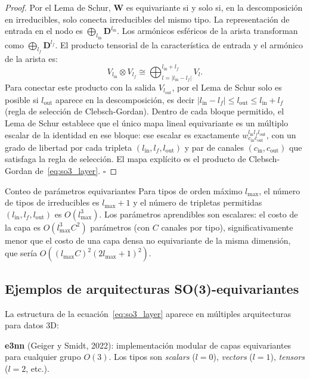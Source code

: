 \begin{proof}
Por el Lema de Schur, $\bm{W}$ es equivariante si y solo si, en la
descomposición en irreducibles, solo conecta irreducibles del mismo tipo.
La representación de entrada en el nodo es $\bigoplus_{l_{\mathrm{in}}}
\bm{D}^{l_{\mathrm{in}}}$. Los armónicos esféricos de la arista transforman
como $\bigoplus_{l_f} \bm{D}^{l_f}$. El producto tensorial de la
característica de entrada y el armónico de la arista es:
\[
  V_{l_{\mathrm{in}}} \otimes V_{l_f}
  \cong \bigoplus_{l=|l_{\mathrm{in}}-l_f|}^{l_{\mathrm{in}}+l_f} V_l.
\]
Para conectar este producto con la salida $V_{l_{\mathrm{out}}}$, por el
Lema de Schur solo es posible si $l_{\mathrm{out}}$ aparece en la
descomposición, es decir $|l_{\mathrm{in}}-l_f| \leq l_{\mathrm{out}}
\leq l_{\mathrm{in}}+l_f$ (regla de selección de Clebsch-Gordan).
Dentro de cada bloque permitido, el Lema de Schur establece que el único
mapa lineal equivariante es un múltiplo escalar de la identidad en ese bloque:
ese escalar es exactamente $w_{c_{\mathrm{in}} c_{\mathrm{out}}}^{l_{\mathrm{in}}
l_f l_{\mathrm{out}}}$, con un grado de libertad por cada tripleta
$(l_{\mathrm{in}}, l_f, l_{\mathrm{out}})$ y par de canales $(c_{\mathrm{in}},
c_{\mathrm{out}})$ que satisfaga la regla de selección. El mapa explícito es
el producto de Clebsch-Gordan de~\eqref{eq:so3_layer}. $\square$
\end{proof}

\begin{observacion}{Conteo de parámetros equivariantes}
Para tipos de orden máximo $l_{\max}$, el número de tipos de irreducibles es
$l_{\max}+1$ y el número de tripletas permitidas $(l_{\mathrm{in}}, l_f,
l_{\mathrm{out}})$ es $O(l_{\max}^3)$. Los parámetros aprendibles son escalares:
el costo de la capa es $O(l_{\max}^3 C^2)$ parámetros (con $C$ canales por
tipo), significativamente menor que el costo de una capa densa no equivariante
de la misma dimensión, que sería $O((l_{\max}C)^2 (2l_{\max}+1)^2)$.
\end{observacion}

\subsection{Ejemplos de arquitecturas SO(3)-equivariantes}
\label{subsec:so3_arqs}

La estructura de la ecuación~\eqref{eq:so3_layer} aparece en múltiples
arquitecturas para datos 3D:

\medskip
\noindent\textbf{e3nn} (Geiger y Smidt, 2022): implementación modular de capas
equivariantes para cualquier grupo $O(3)$. Los tipos son \textit{scalars}
($l=0$), \textit{vectors} ($l=1$), \textit{tensors} ($l=2$, etc.).

